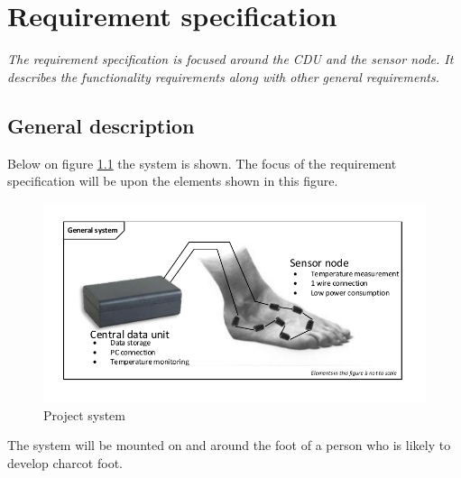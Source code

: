 \chapter{Requirement specification}
\textit{The requirement specification is focused around the CDU and the sensor node. It describes the functionality requirements along with other general requirements.}
\section{General description}
Below on figure \ref{fig:project_system} the system is shown. The focus of the requirement specification will be upon the elements shown in this figure.
\begin{figure}[H]
	\centering
	\includegraphics[width=.9\textwidth]{billeder/7requirementspec/GeneralSystem}
	\caption{Project system}
	\label{fig:project_system}
\end{figure}
The system will be mounted on and around the foot of a person who is likely to develop charcot foot. 
